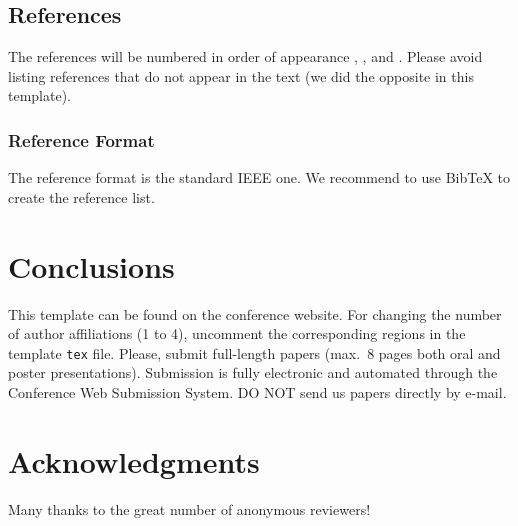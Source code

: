 \documentclass{article}
\begin{document}
\subsection{References}
The references will be numbered in order of appearance \cite{Mitra:Kaiser:1993:DSP:handbook}, \cite{Haykin:1991:adaptive:filter}, \cite{Moorer:2000:AES:audio:millenium} and \cite{Nackaerts:2001:ICMC}. Please avoid listing references that do not appear in the text (we did the opposite in this template).


\subsubsection{Reference Format}
The reference format is the standard IEEE one. We recommend to use BibTeX to create the reference list.


\section{Conclusions}
This template can be found on the conference website.
For changing the number of author affiliations (1 to 4), uncomment the corresponding regions in the template \texttt{tex} file.
Please, submit full-length papers (max.~8 pages both oral and poster presentations).
Submission is fully electronic and automated through the Conference Web Submission System.
DO NOT send us papers directly by e-mail.

\section{Acknowledgments}
Many thanks to the great number of anonymous reviewers!



{}
\end{document}
